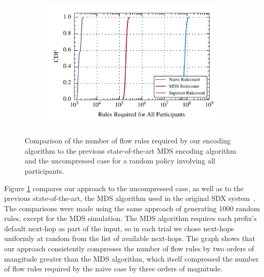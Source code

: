 \begin{figure}[t!] 
\begin{minipage}{1\linewidth}
\begin{subfigure}[b]{0.96\linewidth}
\includegraphics[width=\linewidth]{figures/comparison_cdf}
\end{subfigure} 
\end{minipage} 
\caption{Comparison of the number of flow rules required by our encoding algorithm to the previous state-of-the-art MDS encoding algorithm and the uncompressed case for a random policy involving all participants.}
\label{fig:comparison}
\end{figure}


Figure \ref{fig:comparison} compares our approach to the uncompressed case, as well as to the previous state-of-the-art, the MDS algorithm used in the original SDX system~\cite{sdx}. The comparisons were made using the same approach of generating 1000 random rules, except for the MDS simulation. The MDS algorithm requires each prefix's default next-hop as part of the input, so in each trial we chose next-hops uniformly at random from the list of available next-hops. The graph shows that our approach consistently compresses the number of flow rules by two orders of mangitude greater than the MDS algorithm, which itself compressed the number of flow rules required by the naive case by three orders of magnitude. 

